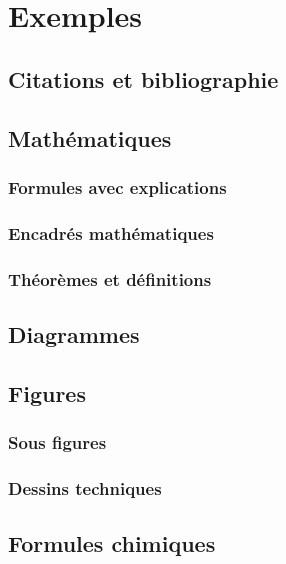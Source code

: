 \chapter{Exemples}



\section{Citations et bibliographie}

\section{Mathématiques}



\subsection{Formules avec explications}



\subsection{Encadrés mathématiques}


\subsection{Théorèmes et définitions}


\section{Diagrammes}

\section{Figures}


\subsection{Sous figures}


\subsection{Dessins techniques}

\section{Formules chimiques}

